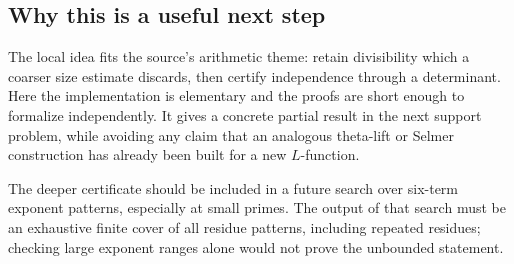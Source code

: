 \subsection{Why this is a useful next step}

The local idea fits the source's arithmetic theme: retain divisibility which a coarser size estimate discards, then certify independence through a determinant. Here the implementation is elementary and the proofs are short enough to formalize independently. It gives a concrete partial result in the next support problem, while avoiding any claim that an analogous theta-lift or Selmer construction has already been built for a new $L$-function.

The deeper certificate should be included in a future search over six-term exponent patterns, especially at small primes. The output of that search must be an exhaustive finite cover of all residue patterns, including repeated residues; checking large exponent ranges alone would not prove the unbounded statement.
